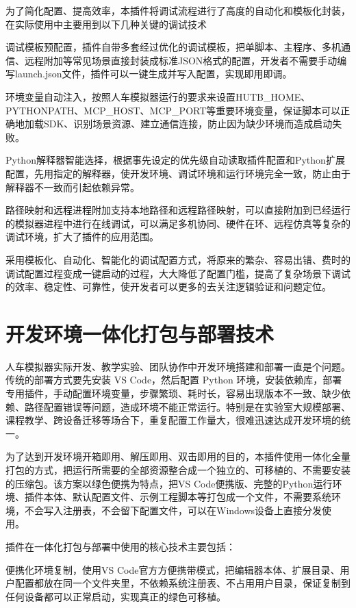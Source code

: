 为了简化配置、提高效率，本插件将调试流程进行了高度的自动化和模板化封装，在实际使用中主要用到以下几种关键的调试技术

调试模板预配置，插件自带多套经过优化的调试模板，把单脚本、主程序、多机通信、远程附加等常见场景直接封装成标准JSON格式的配置，开发者不需要手动编写launch.json文件，插件可以一键生成并写入配置，实现即用即调。

环境变量自动注入，按照人车模拟器运行的要求来设置HUTB\_HOME、PYTHONPATH、MCP\_HOST、MCP\_PORT等重要环境变量，保证脚本可以正确地加载SDK、识别场景资源、建立通信连接，防止因为缺少环境而造成启动失败。

Python解释器智能选择，根据事先设定的优先级自动读取插件配置和Python扩展配置，先用指定的解释器，使开发环境、调试环境和运行环境完全一致，防止由于解释器不一致而引起依赖异常。

路径映射和远程进程附加支持本地路径和远程路径映射，可以直接附加到已经运行的模拟器进程中进行在线调试，可以满足多机协同、硬件在环、远程仿真等复杂的调试环境，扩大了插件的应用范围。

采用模板化、自动化、智能化的调试配置方式，将原来的繁杂、容易出错、费时的调试配置过程变成一键启动的过程，大大降低了配置门槛，提高了复杂场景下调试的效率、稳定性、可靠性，使开发者可以更多的去关注逻辑验证和问题定位。

\section{开发环境一体化打包与部署技术}

人车模拟器实际开发、教学实验、团队协作中开发环境搭建和部署一直是个问题。传统的部署方式要先安装
VS Code，然后配置 Python
环境，安装依赖库，部署专用插件，手动配置环境变量，步骤繁琐、耗时长，容易出现版本不一致、缺少依赖、路径配置错误等问题，造成环境不能正常运行。特别是在实验室大规模部署、课程教学、跨设备迁移等场合下，重复配置工作量大，很难迅速达成开发环境的统一。

为了达到开发环境开箱即用、解压即用、双击即用的目的，本插件使用一体化全量打包的方式，把运行所需要的全部资源整合成一个独立的、可移植的、不需要安装的压缩包。该方案以绿色便携为特点，把VS
Code便携版、完整的Python运行环境、插件本体、默认配置文件、示例工程脚本等打包成一个文件，不需要系统环境，不会写入注册表，不会留下配置文件，可以在Windows设备上直接分发使用。

插件在一体化打包与部署中使用的核心技术主要包括：

便携化环境复制，使用VS
Code官方方便携带模式，把编辑器本体、扩展目录、用户配置都放在同一个文件夹里，不依赖系统注册表、不占用用户目录，保证复制到任何设备都可以正常启动，实现真正的绿色可移植。

